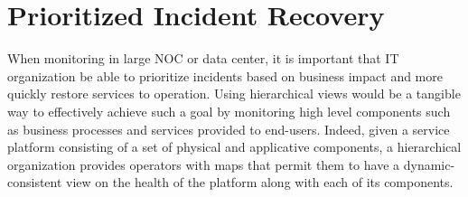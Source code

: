 \documentclass[a4paper,9pt]{article}
\begin{document}
\section{Prioritized Incident Recovery} %
When monitoring in large NOC or data center, it is important that IT organization be able to prioritize incidents based on business impact and more quickly restore services to operation. Using hierarchical views would be a tangible way to effectively achieve such a goal by monitoring high level components such as business processes and services provided to end-users. Indeed, given a service platform consisting of a set of physical and applicative components, a hierarchical organization provides operators with maps that permit them to have a dynamic-consistent view on the health of the platform along with each of its components. 
\end{document}
